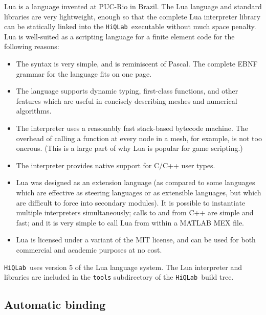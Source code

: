 \documentclass{article}
\newcommand{\hiq}{\texttt{HiQLab}}
\newcommand{\ttt}[1]{\texttt{#1}}
\begin{document}
Lua is a language invented at PUC-Rio in Brazil.  The Lua language and
standard libraries are very lightweight, enough so that the complete
Lua interpreter library can be statically linked into the \hiq\
executable without much space penalty.  Lua is well-suited as a
scripting language for a finite element code for the following
reasons:
\begin{itemize}

  \item The syntax is very simple, and is reminiscent of Pascal.  The
    complete EBNF grammar for the language fits on one page.

  \item The language supports dynamic typing, first-class functions,
    and other features which are useful in concisely describing meshes
    and numerical algorithms.

  \item The interpreter uses a reasonably fast stack-based bytecode
    machine.  The overhead of calling a function at every node in a
    mesh, for example, is not too onerous.  (This is a large part of
    why Lua is popular for game scripting.)

  \item The interpreter provides native support for C/C++ user types.

  \item Lua was designed as an extension language (as compared to some
    languages which are effective as steering languages or as
    extensible languages, but which are difficult to force into
    secondary modules).  It is possible to instantiate multiple
    interpreters simultaneously; calls to and from C++ are simple and
    fast; and it is very simple to call Lua from within a MATLAB MEX
    file.

  \item Lua is licensed under a variant of the MIT license, and can be
    used for both commercial and academic purposes at no cost.

\end{itemize}

\hiq\ uses version 5 of the Lua language system.  The Lua interpreter
and libraries are included in the \ttt{tools} subdirectory of the
\hiq\ build tree.


\subsection{Automatic binding}
\end{document}
